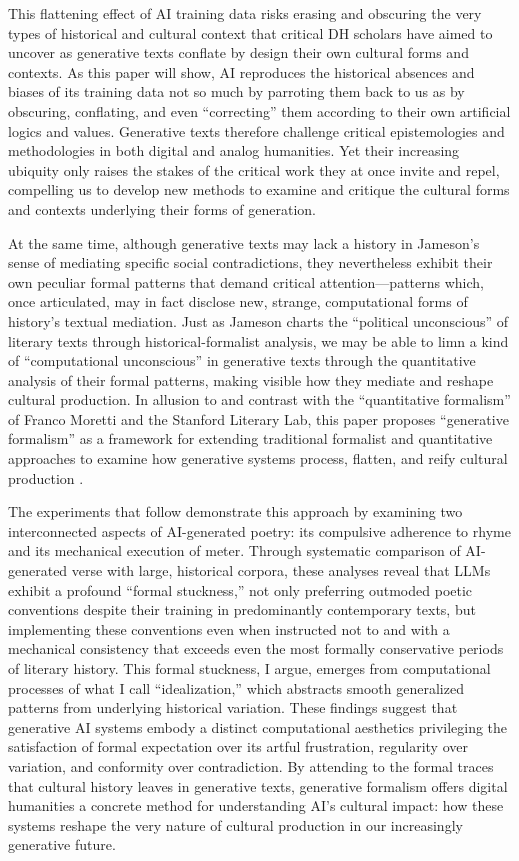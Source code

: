 \documentclass{simple-humanities}         %
\begin{document}
This flattening effect of AI training data risks erasing and obscuring the very types of historical and cultural context that critical DH scholars have aimed to uncover as generative texts conflate by design their own cultural forms and contexts.
As this paper will show, AI reproduces the historical absences and biases of its training data not so much by parroting them back to us as by obscuring, conflating, and even ``correcting'' them according to their own artificial logics and values.
Generative texts therefore challenge critical epistemologies and methodologies in both digital and analog humanities.
Yet their increasing ubiquity only raises the stakes of the critical work they at once invite and repel, compelling us to develop new methods to examine and critique the cultural forms and contexts underlying their forms of generation.

At the same time, although generative texts may lack a history in Jameson's sense of mediating specific social contradictions, they nevertheless exhibit their own peculiar formal patterns that demand critical attention---patterns which, once articulated, may in fact disclose new, strange, computational forms of history's textual mediation.
Just as Jameson charts the ``political unconscious'' of literary texts through historical-formalist analysis, we may be able to limn a kind of ``computational unconscious'' in generative texts through the quantitative analysis of their formal patterns, making visible how they mediate and reshape cultural production.
In allusion to and contrast with the ``quantitative formalism'' of Franco Moretti and the Stanford Literary Lab, this paper proposes ``generative formalism'' as a framework for extending traditional formalist and quantitative approaches to examine how generative systems process, flatten, and reify cultural production \parencite{allisonQuantitativeFormatualismExperiment2011}.

The experiments that follow demonstrate this approach by examining two interconnected aspects of AI-generated poetry: its compulsive adherence to rhyme and its mechanical execution of meter.
Through systematic comparison of AI-generated verse with large, historical corpora, these analyses reveal that LLMs exhibit a profound ``formal stuckness,'' not only preferring outmoded poetic conventions despite their training in predominantly contemporary texts, but implementing these conventions even when instructed not to and with a mechanical consistency that exceeds even the most formally conservative periods of literary history.
This formal stuckness, I argue, emerges from computational processes of what I call ``idealization,'' which abstracts smooth generalized patterns from underlying historical variation.
These findings suggest that generative AI systems embody a distinct computational aesthetics privileging the satisfaction of formal expectation over its artful frustration, regularity over variation, and conformity over contradiction.
By attending to the formal traces that cultural history leaves in generative texts, generative formalism offers digital humanities a concrete method for understanding AI's cultural impact: how these systems reshape the very nature of cultural production in our increasingly generative future.
\end{document}
